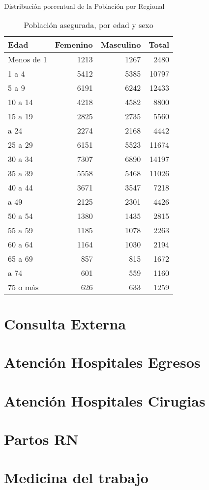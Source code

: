 \documentclass[
]{book}
\begin{document}
\label{fig:unnamed-chunk-8}Distribución porcentual de la Población por Regional

\begin{table}

\caption{\label{tab:unnamed-chunk-10}Población asegurada, por edad y sexo}
\centering
\begin{tabular}[t]{lrrr}
\toprule
Edad & Femenino & Masculino & Total\\
\midrule
Menos de 1 & 1213 & 1267 & 2480\\
1 a 4 & 5412 & 5385 & 10797\\
5 a 9 & 6191 & 6242 & 12433\\
10 a 14 & 4218 & 4582 & 8800\\
15 a 19 & 2825 & 2735 & 5560\\
\addlinespace
20 a 24 & 2274 & 2168 & 4442\\
25 a 29 & 6151 & 5523 & 11674\\
30 a 34 & 7307 & 6890 & 14197\\
35 a 39 & 5558 & 5468 & 11026\\
40 a 44 & 3671 & 3547 & 7218\\
\addlinespace
45 a 49 & 2125 & 2301 & 4426\\
50 a 54 & 1380 & 1435 & 2815\\
55 a 59 & 1185 & 1078 & 2263\\
60 a 64 & 1164 & 1030 & 2194\\
65 a 69 & 857 & 815 & 1672\\
\addlinespace
70 a 74 & 601 & 559 & 1160\\
75 o más & 626 & 633 & 1259\\
\bottomrule
\end{tabular}
\end{table}

\hypertarget{consulta-externa}{%
\chapter{Consulta Externa}\label{consulta-externa}}

\hypertarget{atenciuxf3n-hospitales-egresos}{%
\chapter{Atención Hospitales Egresos}\label{atenciuxf3n-hospitales-egresos}}

\hypertarget{atenciuxf3n-hospitales-cirugias}{%
\chapter{Atención Hospitales Cirugias}\label{atenciuxf3n-hospitales-cirugias}}

\hypertarget{partos-rn}{%
\chapter{Partos RN}\label{partos-rn}}

\hypertarget{medicina-del-trabajo}{%
\chapter{Medicina del trabajo}\label{medicina-del-trabajo}}

  
\end{document}
